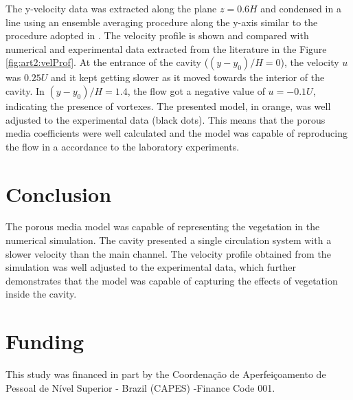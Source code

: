 The y-velocity data was extracted along the plane $z=0.6H$ and condensed in a line using an ensemble averaging procedure along the y-axis similar to the procedure adopted in \textcite{sukhodolov2014}. The velocity profile is shown and compared with numerical and experimental data extracted from the literature in the Figure \ref{fig:art2:velProf}. At the entrance of the cavity ($(y-y_0)/H = 0$), the velocity $u$ was $0.25U$ and it kept getting slower as it moved towards the interior of the cavity. In $(y-y_0)/H = 1.4$, the flow got a negative value of $u = -0.1U$, indicating the presence of vortexes. The presented model, in orange, was well adjusted to the experimental data (black dots). This means that the porous media coefficients were well calculated and the model was capable of reproducing the flow in a accordance to the laboratory experiments.

\section{Conclusion}
The porous media model was capable of representing the vegetation in the numerical simulation. The cavity presented a single circulation system with a slower velocity than the main channel. The velocity profile obtained from the simulation was well adjusted to the experimental data, which further demonstrates that the model was capable of capturing the effects of vegetation inside the cavity.


\section*{Funding}
This study was financed in part by the Coordenação de Aperfeiçoamento de Pessoal de Nível Superior - Brazil (CAPES) -Finance Code 001.
\printbibliography[segment=\therefsegment,heading=subbibliography, title={References}]